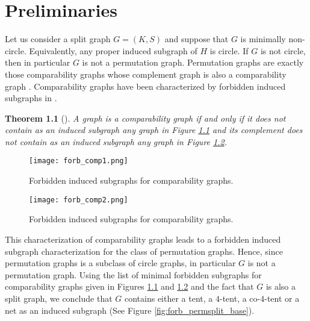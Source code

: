 \documentclass[12pt]{book}
\theoremstyle{plain}
\newtheorem{teo}{Theorem}[chapter]
\theoremstyle{remark}
\begin{document}



%
\chapter{Preliminaries} \label{chapter:partitions}

 
Let us consider a split graph $G=(K,S)$ and suppose that $G$ is minimally non-circle. Equivalently, any proper induced subgraph of $H$ is circle. If $G$ is not circle, then in particular $G$ is not a permutation graph. 
Permutation graphs are exactly those comparability graphs whose complement graph is also a comparability graph \cite{EPL72}. Comparability graphs have been characterized by forbidden induced subgraphs in \cite{G67}.

\begin{teo}[\cite{G67}]
A graph is a comparability graph if and only if it does not contain as an induced subgraph any graph in Figure \ref{fig:forb_comparability1} and its complement does not contain as an induced subgraph any graph in Figure \ref{fig:forb_comparability2}.
\end{teo}

\begin{figure}[h]
\centering
\texttt{[image: forb\_comp1.png]}
\caption{Forbidden induced subgraphs for comparability graphs.} \label{fig:forb_comparability1}
\end{figure} 

\begin{figure}[h]
\centering
\texttt{[image: forb\_comp2.png]}
\caption{Forbidden induced subgraphs for comparability graphs.} \label{fig:forb_comparability2}
\end{figure} 


This characterization of comparability graphs leads to a forbidden induced subgraph characterization for the class of permutation graphs.
Hence, since permutation graphs is a subclass of circle graphs, in particular $G$ is not a permutation graph. Using the list of minimal forbidden subgraphs for comparability graphs given in Figures \ref{fig:forb_comparability1} and \ref{fig:forb_comparability2} and the fact that $G$ is also a split graph, we conclude that $G$ contains either a tent, a $4$-tent, a co-$4$-tent or a net as an induced subgraph (See Figure \ref{fig:forb_permsplit_base}). %
\end{document}
